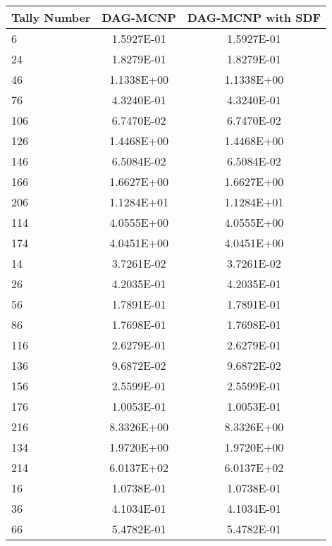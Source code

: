 \begin{table}[H]
  \small
  \begin{center}
    \begin{tabular}{lcc}
      \toprule
      Tally Number & DAG-MCNP   & DAG-MCNP with SDF \\
      \toprule
      6            & 1.5927E-01 & 1.5927E-01        \\
      24           & 1.8279E-01 & 1.8279E-01        \\
      46           & 1.1338E+00 & 1.1338E+00        \\
      76           & 4.3240E-01 & 4.3240E-01        \\
      106          & 6.7470E-02 & 6.7470E-02        \\
      126          & 1.4468E+00 & 1.4468E+00        \\
      146          & 6.5084E-02 & 6.5084E-02        \\
      166          & 1.6627E+00 & 1.6627E+00        \\
      206          & 1.1284E+01 & 1.1284E+01        \\
      114          & 4.0555E+00 & 4.0555E+00        \\
      174          & 4.0451E+00 & 4.0451E+00        \\
      14           & 3.7261E-02 & 3.7261E-02        \\
      26           & 4.2035E-01 & 4.2035E-01        \\
      56           & 1.7891E-01 & 1.7891E-01        \\
      86           & 1.7698E-01 & 1.7698E-01        \\
      116          & 2.6279E-01 & 2.6279E-01        \\
      136          & 9.6872E-02 & 9.6872E-02        \\
      156          & 2.5599E-01 & 2.5599E-01        \\
      176          & 1.0053E-01 & 1.0053E-01        \\
      216          & 8.3326E+00 & 8.3326E+00        \\
      134          & 1.9720E+00 & 1.9720E+00        \\
      214          & 6.0137E+02 & 6.0137E+02        \\
      16           & 1.0738E-01 & 1.0738E-01        \\
      36           & 4.1034E-01 & 4.1034E-01        \\
      66           & 5.4782E-01 & 5.4782E-01        \\

\end{tabular}
\end{center}
\end{table}
